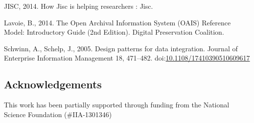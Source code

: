 \documentclass[final]{beamer}
\begin{document}
\begin{frame}[t]
\begin{multicols}{2}
\hypertarget{ref-ux5fhowux5f2014}{}
JISC, 2014. How Jisc is helping researchers : Jisc.

\hypertarget{ref-oclcux5fopenux5f2014}{}
Lavoie, B., 2014. The Open Archival Information System (OAIS) Reference
Model: Introductory Guide (2nd Edition). Digital Preservation Coalition.

\hypertarget{ref-schwinnux5fdesignux5f2005}{}
Schwinn, A., Schelp, J., 2005. Design patterns for data integration.
Journal of Enterprise Information Management 18, 471--482.
doi:\href{https://doi.org/10.1108/17410390510609617}{10.1108/17410390510609617}



\subsection{Acknowledgements}

This work has been partially supported through funding from the National
Science Foundation (\#IIA-1301346)







\end{multicols}

\end{frame}
\end{document}
